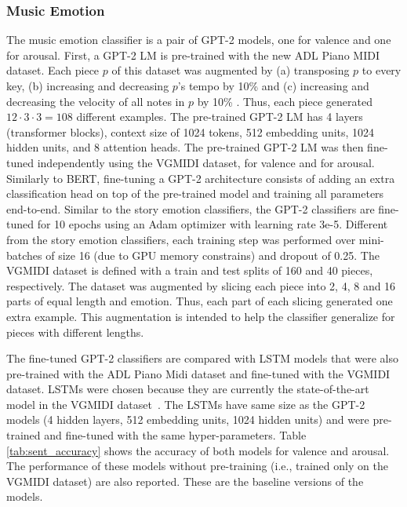 \subsubsection{Music Emotion}

The music emotion classifier is a pair of GPT-2 models, one for valence and one for arousal. First, a GPT-2 LM is pre-trained with the new ADL Piano MIDI dataset. Each piece $p$ of this dataset was augmented by (a) transposing $p$ to every key, (b) increasing and decreasing $p$'s tempo by 10\% and (c) increasing and decreasing the velocity of all notes in $p$ by 10\% \cite{oore2017learning}. Thus, each piece generated $12 \cdot 3 \cdot 3 = 108$ different examples. The pre-trained GPT-2 LM has 4 layers (transformer blocks), context size of 1024 tokens, 512 embedding units, 1024 hidden units, and 8 attention heads. The pre-trained GPT-2 LM was then fine-tuned  independently using the VGMIDI dataset, for valence and for arousal. Similarly to BERT, fine-tuning a GPT-2 architecture consists of adding an extra classification head on top of the pre-trained model and training all parameters end-to-end. Similar to the story emotion classifiers, the GPT-2 classifiers are fine-tuned for 10 epochs using an Adam optimizer with learning rate 3e-5. Different from the story emotion classifiers, each training step was performed over mini-batches of size 16 (due to GPU memory constrains) and dropout of 0.25. The VGMIDI dataset is defined with a train and test splits of 160 and 40 pieces, respectively. The dataset was augmented by slicing each piece into 2, 4, 8 and 16 parts of equal length and emotion. Thus, each part of each slicing generated one extra example. This augmentation is intended to help the classifier generalize for pieces with different lengths.

The fine-tuned GPT-2 classifiers are compared with LSTM models that were also pre-trained with the ADL Piano Midi dataset and fine-tuned with the VGMIDI dataset. LSTMs were chosen because they are currently the state-of-the-art model in the VGMIDI dataset~\cite{ferreira_2019}. The LSTMs have same size as the GPT-2 models (4 hidden layers, 512 embedding units, 1024 hidden units) and were pre-trained and fine-tuned with the same hyper-parameters. Table \ref{tab:sent_accuracy} shows the accuracy of both models for valence and arousal. The performance of these models without pre-training (i.e., trained only on the VGMIDI dataset) are also reported. These are the baseline versions of the models.


